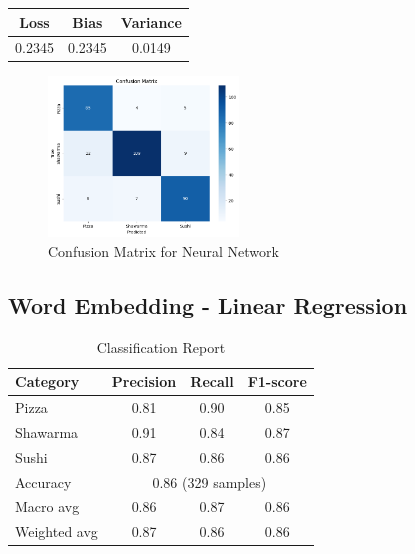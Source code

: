 \begin{table}[h]
    \centering
    \begin{tabular}{ccc}
        \hline
        Loss   & Bias   & Variance \\
        \hline
        0.2345 & 0.2345 & 0.0149   \\
        \hline
    \end{tabular}
\end{table}

\begin{figure}[h]
    \centering
    \includegraphics[width=0.45\textwidth]{params/neuralnetwork_confusion.png}
    \caption{Confusion Matrix for Neural Network}
\end{figure}

\subsection{Word Embedding - Linear Regression}
\begin{table}[h]
    \centering
    \begin{tabular}{lccc}
        \hline
        Category     & Precision                              & Recall & F1-score \\
        \hline
        Pizza        & 0.81                                   & 0.90   & 0.85     \\
        Shawarma     & 0.91                                   & 0.84   & 0.87     \\
        Sushi        & 0.87                                   & 0.86   & 0.86     \\
        \hline
        Accuracy     & \multicolumn{3}{c}{0.86 (329 samples)}                     \\
        Macro avg    & 0.86                                   & 0.87   & 0.86     \\
        Weighted avg & 0.87                                   & 0.86   & 0.86     \\
        \hline
    \end{tabular}
    \caption{Classification Report}
\end{table}

